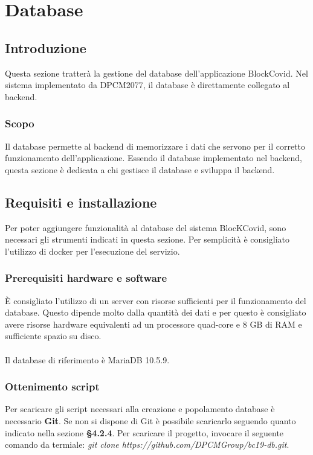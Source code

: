 \section{Database}
\subsection{Introduzione}
Questa sezione tratterà la gestione del database dell'applicazione BlockCovid. Nel sistema implementato da DPCM2077, il database è direttamente collegato al backend.

\subsubsection{Scopo}
Il database permette al backend di memorizzare i dati che servono per il corretto funzionamento dell'applicazione. Essendo il database implementato nel backend, questa sezione è dedicata a chi gestisce il database e sviluppa il backend.

\subsection{Requisiti e installazione}
Per poter aggiungere funzionalità al database del sistema BlocKCovid, sono necessari gli strumenti indicati in questa sezione. Per semplicità è consigliato l'utilizzo di docker per l'esecuzione del servizio.

\subsubsection{Prerequisiti hardware e software}
È consigliato l'utilizzo di un server con risorse sufficienti per il funzionamento del database. Questo dipende molto dalla quantità dei dati e per questo è consigliato avere risorse hardware equivalenti ad un processore quad-core e 8 GB di RAM e sufficiente spazio su disco.
\\\\
Il database di riferimento è MariaDB 10.5.9.

\subsubsection{Ottenimento script}
Per scaricare gli script necessari alla creazione e popolamento database è necessario \textbf{Git}. Se non si dispone di Git è possibile scaricarlo seguendo quanto indicato nella sezione \textbf{§4.2.4}. Per scaricare il progetto, invocare il seguente comando da termiale: \textit{git clone https://github.com/DPCMGroup/bc19-db.git}.

